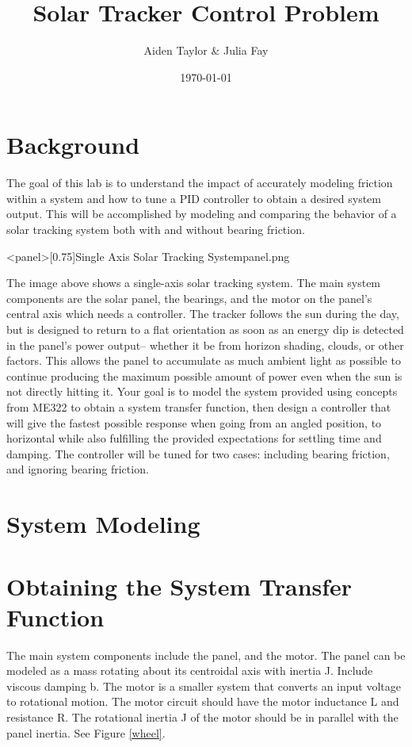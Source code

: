 \documentclass{homework}
\author{Aiden Taylor \& Julia Fay}
\date{\today}
\title{Solar Tracker Control Problem}
\begin{document}
  \maketitle
\section*{Background}

The goal of this lab is to understand the impact of accurately modeling friction within a system and how to tune a PID controller to obtain a desired system output. This will be accomplished by modeling and comparing the behavior of a solar tracking system both with and without bearing friction.

\img<panel>[0.75]{Single Axis Solar Tracking System}{panel.png}

The image above shows a single-axis solar tracking system. The main system components are the solar panel, the bearings, and the motor on the panel's central axis which needs a controller. The tracker follows the sun during the day, but is designed to return to a flat orientation as soon as an energy dip is detected in the panel's power output– whether it be from horizon shading, clouds, or other factors. This allows the panel to accumulate as much ambient light as possible to continue producing the maximum possible amount of power even when the sun is not directly hitting it. Your goal is to model the system provided using concepts from ME322 to obtain a system transfer function, then design a controller that will give the fastest possible response when going from an angled position, to horizontal while also fulfilling the provided expectations for settling time and damping. The controller will be tuned for two cases: including bearing friction, and ignoring bearing friction. 

\newpage
\section*{System Modeling}
\section*{Obtaining the System Transfer Function}

\question The main system components include the panel, and the motor. The panel can be modeled as a mass rotating about its centroidal axis with inertia J. Include viscous damping b. The motor is a smaller system that converts an input voltage to rotational motion. The motor circuit should have the motor inductance L and resistance R. The rotational inertia J of the motor should be in parallel with the panel inertia. See Figure \ref{wheel}.
\end{document}
